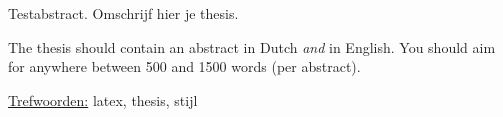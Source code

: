 Testabstract. Omschrijf hier je thesis.

The thesis should contain an abstract in Dutch \emph{and} in English.
You should aim for anywhere between 500 and 1500 words (per abstract).

\underline{Trefwoorden:} latex, thesis, stijl